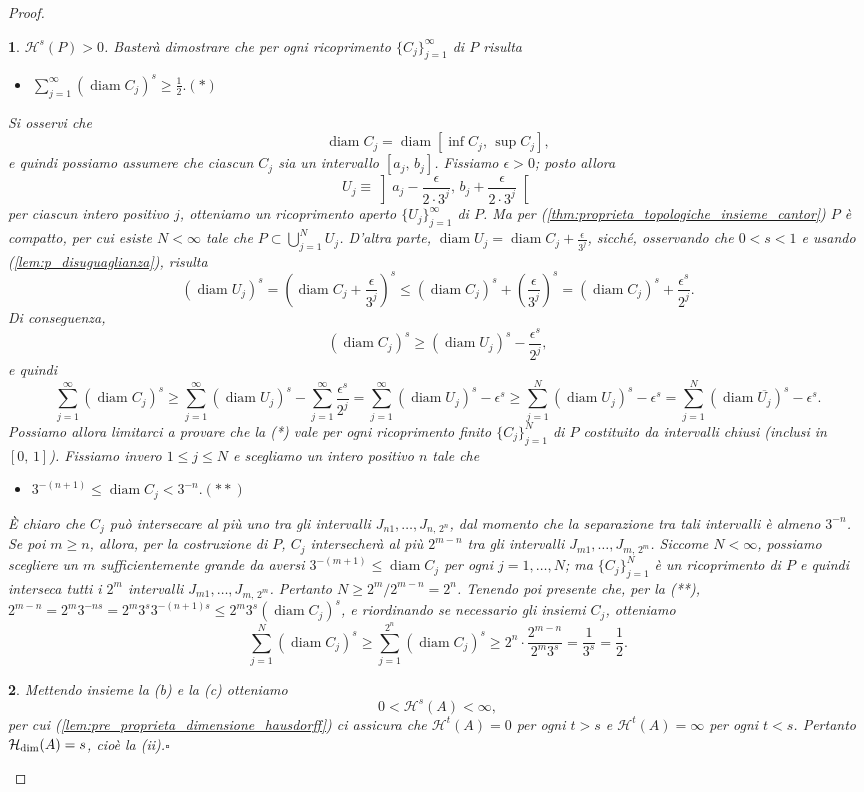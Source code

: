\documentclass[a4paper,10pt,openright,oneside]{book}
\theoremstyle{theoremstyle}
\theoremstyle{theoremstylewoheader}
\theoremstyle{theoremstyle}
\theoremstyle{proofsecstyle}
\newtheorem{proofsec}{}
\theoremstyle{nonumberplain}
\newtheorem{proof}{Dim.}
\newcommand{\Haus}{\ensuremath{\mathcal{H}}}
\newcommand{\Hausdim}{\ensuremath{\Haus_\textup{dim}}}
\newcommand{\closure}[1]{\ensuremath{\overline{#1}}}
\DeclareMathOperator{\diam}{diam}
\renewcommand{\qedsymbol}{\ensuremath{\square}}
\newcommand{\qed}{\unskip\nobreak\hfill\nobreak\hspace{.5em}\qedsymbol}
\newcommand{\mymath}[2]{\begin{itemize}%
  \item[]\hfill\hbox{}\ensuremath{\displaystyle #1}\hfill\ensuremath{\displaystyle #2}%
  \end{itemize}}
\begin{document}
\begin{proof}
\begin{proofsec}
$\Haus^s (P) > 0$.\hspace{.5em} Basterà dimostrare che per ogni ricoprimento $\{C_j\}_{j=1}^\infty$ di $P$ risulta \mymath{\sum_{j=1}^\infty (\diam C_j)^s \ge \frac{1}{2}.}{(*)} Si osservi che
\[
\diam C_j = \diam [\inf C_j,\, \sup C_j],
\]
e quindi possiamo assumere che ciascun $C_j$ sia un intervallo $[a_j,\, b_j]$. Fissiamo $\epsilon > 0$; posto allora
\[
U_j \equiv \left]a_j - \frac{\epsilon}{2 \cdot 3^j},\, b_j + \frac{\epsilon}{2 \cdot 3^j}\right[
\]
per ciascun intero positivo $j$, otteniamo un ricoprimento aperto $\{U_j\}_{j=1}^\infty$ di $P$. Ma per (\ref{thm:proprieta_topologiche_insieme_cantor}) $P$ è compatto, per cui esiste $N < \infty$ tale che $P \subset \bigcup_{j=1}^N U_j$.
D'altra parte, $\diam U_j = \diam C_j + \frac{\epsilon}{3^j}$, sicché, osservando che $0 < s < 1$ e usando (\ref{lem:p_disuguaglianza}), risulta
\[
(\diam U_j)^s = \left(\diam C_j + \frac{\epsilon}{3^j}\right)^s \le (\diam C_j)^s + \left(\frac{\epsilon}{3^j}\right)^s = (\diam C_j)^s + \frac{\epsilon^s}{2^j}.
\]
Di conseguenza,
\[
(\diam C_j)^s \ge (\diam U_j)^s - \frac{\epsilon^s}{2^j},
\]
e quindi
\[
\sum_{j=1}^\infty (\diam C_j)^s \ge \sum_{j=1}^\infty (\diam U_j)^s - \sum_{j=1}^\infty \frac{\epsilon^s}{2^j} = \sum_{j=1}^\infty (\diam U_j)^s - \epsilon^s \ge \sum_{j=1}^N (\diam U_j)^s - \epsilon^s = \sum_{j=1}^N (\diam \closure{U_j})^s - \epsilon^s. 
\]
Possiamo allora limitarci a provare che la (*) vale per ogni ricoprimento \emph{finito} $\{C_j\}_{j=1}^N$ di $P$ costituito da intervalli chiusi (inclusi in $[0,\, 1]$). Fissiamo invero $1 \le j \le N$ e scegliamo un intero positivo $n$ tale che \mymath{3^{-(n+1)} \le \diam C_j < 3^{-n}.}{(**)} \`E chiaro che $C_j$ può intersecare al più uno tra gli intervalli $J_{n1}, \ldots, J_{n,\, 2^n}$, dal momento che la separazione tra tali intervalli è almeno $3^{-n}$. Se poi $m \ge n$, allora, per la costruzione di $P$, $C_j$ intersecherà al più $2^{m-n}$ tra gli intervalli $J_{m1}, \ldots, J_{m,\, 2^m}$. Siccome $N < \infty$, possiamo scegliere un $m$ sufficientemente grande da aversi $3^{-(m+1)} \le \diam C_j$ per ogni $j = 1, \ldots, N$; ma $\{C_j\}_{j=1}^N$ è un ricoprimento di $P$ e quindi interseca \emph{tutti}\/ i $2^m$ intervalli $J_{m1}, \ldots, J_{m,\, 2^m}$. Pertanto $N \ge 2^m / 2^{m-n} = 2^n$. Tenendo poi presente che, per la (**), $2^{m-n} = 2^m3^{-ns} = 2^m3^s3^{-(n+1)s} \le 2^m3^s(\diam C_j)^s$, e riordinando se necessario gli insiemi $C_j$, otteniamo
\[
\sum_{j=1}^N (\diam C_j)^s \ge \sum_{j=1}^{2^n} (\diam C_j)^s \ge 2^n \cdot \frac{2^{m-n}}{2^m3^s} = \frac{1}{3^s} = \frac{1}{2}.
\] 
\end{proofsec}

\begin{proofsec}
Mettendo insieme la (b) e la (c) otteniamo
\[
0 < \Haus^s(A) < \infty,
\]
per cui (\ref{lem:pre_proprieta_dimensione_hausdorff}) ci assicura che $\Haus^t(A) = 0$ per ogni $t > s$ e $\Haus^t(A) = \infty$ per ogni $t < s$. Pertanto $\Hausdim(A) = s$, cioè la (ii).\qed
\end{proofsec}
\end{proof}
\end{document}
